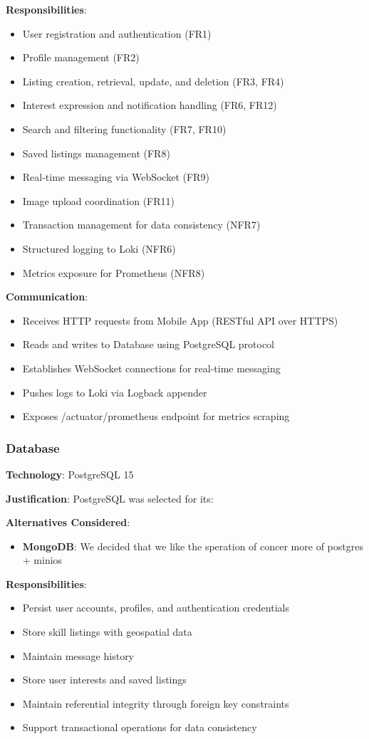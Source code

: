\textbf{Responsibilities}:
\begin{itemize}
    \item User registration and authentication (FR1)
    \item Profile management (FR2)
    \item Listing creation, retrieval, update, and deletion (FR3, FR4)
    \item Interest expression and notification handling (FR6, FR12)
    \item Search and filtering functionality (FR7, FR10)
    \item Saved listings management (FR8)
    \item Real-time messaging via WebSocket (FR9)
    \item Image upload coordination (FR11)
    \item Transaction management for data consistency (NFR7)
    \item Structured logging to Loki (NFR6)
    \item Metrics exposure for Prometheus (NFR8)
\end{itemize}

\textbf{Communication}:
\begin{itemize}
    \item Receives HTTP requests from Mobile App (RESTful API over HTTPS)
    \item Reads and writes to Database using PostgreSQL protocol
    \item Establishes WebSocket connections for real-time messaging
    \item Pushes logs to Loki via Logback appender
    \item Exposes /actuator/prometheus endpoint for metrics scraping
\end{itemize}

\subsubsection{Database}
\textbf{Technology}: PostgreSQL 15

\textbf{Justification}:
PostgreSQL was selected for its:

\textbf{Alternatives Considered}:
\begin{itemize}
    \item \textbf{MongoDB}: We decided that we like the speration of concer more of postgres + minios
\end{itemize}

\textbf{Responsibilities}:
\begin{itemize}
    \item Persist user accounts, profiles, and authentication credentials
    \item Store skill listings with geospatial data
    \item Maintain message history
    \item Store user interests and saved listings
    \item Maintain referential integrity through foreign key constraints
    \item Support transactional operations for data consistency
\end{itemize}

